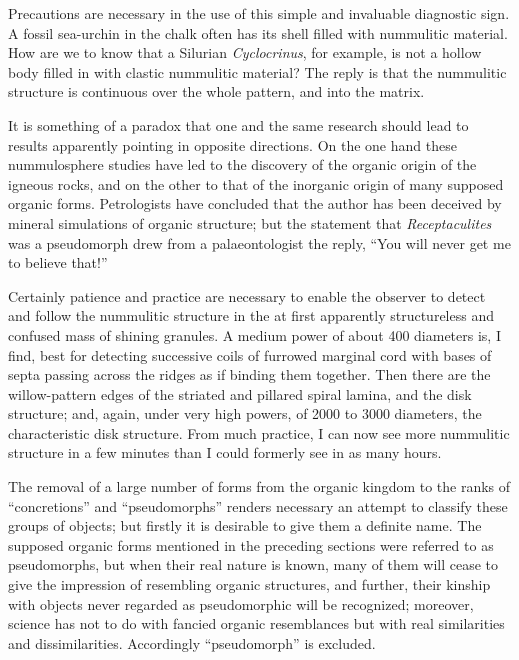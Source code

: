 \documentclass[a4paper, 12pt, oneside, landscape]{article}
\begin{document}
Precautions are necessary in the use of this simple and invaluable diagnostic sign. A fossil sea-urchin in the chalk often has its shell filled with nummulitic material. How are we to know that a Silurian \emph{Cyclocrinus}, for example, is not a hollow body filled in with clastic nummulitic material? The reply is that the nummulitic structure is continuous over the whole pattern, and into the matrix.

It is something of a paradox that one and the same research should lead to results apparently pointing in opposite directions. On the one hand these nummulosphere studies have led to the discovery of the organic origin of the igneous rocks, and on the other to that of the inorganic origin of many supposed organic forms. Petrologists have concluded that the author has been deceived by mineral simulations of organic structure; but the statement that \emph{Receptaculites} was a pseudomorph drew from a palaeontologist the reply, ``You will never get me to believe that!''

Certainly patience and practice are necessary to enable the observer to detect and follow the nummulitic structure in the at first apparently structureless and confused mass of shining granules. A medium power of about 400 diameters is, I find, best for detecting successive coils of furrowed marginal cord with bases of septa passing across the ridges as if binding them together. Then there are the willow-pattern edges of the striated and pillared spiral lamina, and the disk structure; and, again, under very high powers, of 2000 to 3000 diameters, the characteristic disk structure. From much practice, I can now see more nummulitic structure in a few minutes than I could formerly see in as many hours.

The removal of a large number of forms from the organic kingdom to the ranks of ``concretions'' and ``pseudomorphs'' renders necessary an attempt to classify these groups of objects; but firstly it is desirable to give them a definite name. The supposed organic forms mentioned in the preceding sections were referred to as pseudomorphs, but when their real nature is known, many of them will cease to give the impression of resembling organic structures, and further, their kinship with objects never regarded as pseudomorphic will be recognized; moreover, science has not to do with fancied organic resemblances but with real similarities and dissimilarities. Accordingly ``pseudomorph'' is excluded.
\end{document}
